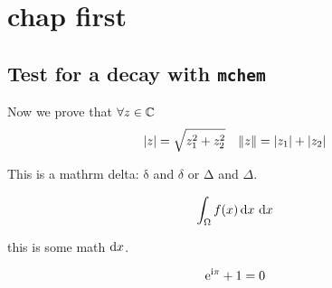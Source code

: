 \documentclass[
	10pt,
	twoside,
	openright,
]{scrbook}
\title{}
\subtitle{}
\author{
  
}
\date{}
\begin{document}
%
\frontmatter
{}
	\maketitle
	\thispagestyle{empty}

	\cleardoublepage
{}
	

	\cleardoublepage
{}
	

	\cleardoublepage
{}
	

	\cleardoublepage
{}
	\tableofcontents

%
\mainmatter
\chapter{chap first}
\lipsum

\section{Test for a decay with \texttt{mchem}}

Now we prove that $\forall z \in \mathbb{C}$
\begin{equation*}
    \lvert z\rvert = \sqrt{z_1^2 + z_2^2}
    \quad
    \lVert z\rVert = \lvert z_1\rvert + \lvert z_2\rvert
\end{equation*}


This is a mathrm delta: $\mathrm{\delta}$ and $\delta$ or $\mathrm{\Delta}$ and $\Delta$.

\begin{equation}
    \int_{\Omega} f(x)\ud x\ \mathrm{d}x
\end{equation}

{\sffamily this is some math $\mathop{}\!\textup{d} x$.}

\begin{equation}
    \mathrm{e}^{\mathrm{i}\pi} + 1 = 0
\end{equation}
\end{document}
